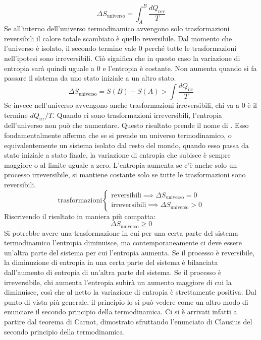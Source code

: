 \documentclass[10pt,a4paper]{book}
\begin{document}
\[
	\Delta S_{\text{universo} } = \int_A^B \frac{dQ_{\text{rev} } }{T}
\]
Se all'interno dell'universo termodinamico avvengono solo trasformazioni reversibili il calore totale scambiato è quello reversibile. Dal momento che l'universo è isolato, il secondo termine vale $0$ perché tutte le trasformazioni nell'ipotesi sono irreversibili. Ciò significa che in questo caso la variazione di entropia sarà quindi uguale a $0$ e l'entropia è costante. Non aumenta quando si fa passare il sistema da uno stato iniziale a un altro stato.
\[
	\Delta S_{\text{universo}} = S(B)-S(A) > \int \frac{dQ_{\text{irr} } }{T}
\]
Se invece nell'universo avvengono anche trasformazioni irreversibili, chi va a $0$ è il termine $dQ_\text{irr}/T$. Quando ci sono trasformazioni irreversibili, l'entropia dell'universo non può che aumentare. Questo risultato prende il nome di . Esso fondamentalmente afferma che se si prende un universo termodinamico, o equivalentemente un sistema isolato dal resto del mondo,  quando esso passa da stato iniziale a stato finale, la variazione di entropia che subisce è sempre maggiore o al limite uguale a zero. L'entropia aumenta se c'è anche solo un processo irreversibile, si mantiene costante solo se tutte le trasformazioni sono reversibili.
\[
	\text{trasformazioni}
	\left\{ \begin{array}{l}
	 	\text{reversibili} \implies \Delta S_{\text{universo}} = 0 \\
		\text{irreversibili} \implies  \Delta S_{\text{universo}} > 0
	\end{array} \right.
\]
Riscrivendo il risultato in maniera più compatta:
\[
	\boxed{\Delta S_{\text{universo}} \geq 0}
\]
Si potrebbe avere una trasformazione in cui per una certa parte del sistema termodinamico l'entropia diminuisce, ma contemporaneamente ci deve essere un'altra parte del sistema per cui l'entropia aumenta. Se il processo è reversibile, la diminuzione di entropia in una certa parte del sistema è bilanciata dall'aumento di entropia di un'altra parte del sistema. Se il processo è irreversibile, chi aumenta l'entropia subirà un aumento maggiore di cui la diminuisce, così che al netto la variazione di entropia è strettamente positiva. Dal punto di vista più generale, il principio lo si può vedere come un altro modo di enunciare il secondo principio della termodinamica. Ci si è arrivati infatti a partire dal teorema di Carnot, dimostrato sfruttando l'enunciato di Clausius del secondo principio della termodinamica.
\end{document}
